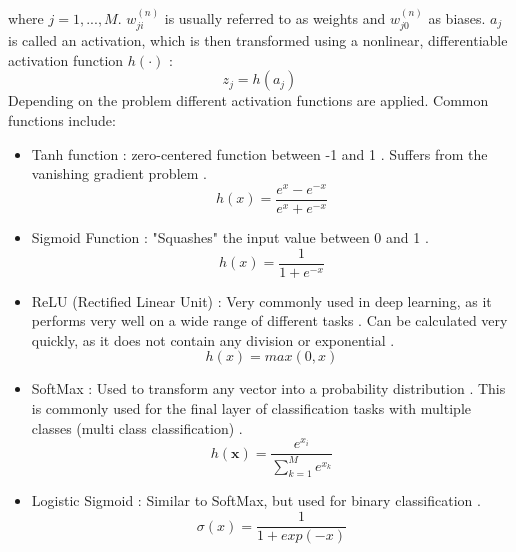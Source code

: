 \documentclass[draft,final,oneside]{vutinfth} %
\begin{document}
where $j = 1, ..., M$. $w_{ji}^{(n)}$ is usually referred to as weights and $w_{j0}^{(n)}$ as biases. $a_j$ is called an activation, which is then transformed using a nonlinear, differentiable activation function $h(\cdot)$ \cite{bishop}:
\begin{equation}
z_j = h(a_j)
\end{equation}
Depending on the problem different activation functions are applied. Common functions include:
\begin{itemize}
\item Tanh function \cite{activationfunctions}: zero-centered function between -1 and 1 \cite{activationfunctions}. Suffers from the vanishing gradient problem \cite{activationfunctions}.
\begin{equation}
h(x) = \dfrac{e^x - e^{-x}}{e^x + e^{-x}}
\end{equation}
\item Sigmoid Function \cite{anintroductiontoneuralnetworks}: "Squashes" the input value between 0 and 1 \cite{anintroductiontoneuralnetworks}.
\begin{equation}
h(x) = \dfrac {1} {1 + e^{-x}}
\end{equation}
\item ReLU (Rectified Linear Unit) \cite{Goodfellow-et-al-2016}: Very commonly used in deep learning, as it performs very well on a wide range of different tasks \cite{activationfunctions}. Can be calculated very quickly, as it does not contain any division or exponential \cite{activationfunctions}.
\begin{equation}
h(x) = max(0, x)
\end{equation}
\item SoftMax \cite{Goodfellow-et-al-2016}: Used to transform any vector into a probability distribution \cite{activationfunctions}. This is commonly used for the final layer of classification tasks with multiple classes (multi class classification) \cite{activationfunctions}.
\begin{equation}
h(\boldsymbol{x}) = \dfrac{e^{x_i}}{\sum_{k=1}^{M} e^{x_k}}
\end{equation}
\item Logistic Sigmoid \cite{Goodfellow-et-al-2016}: Similar to SoftMax, but used for binary classification \cite{Goodfellow-et-al-2016}.
\begin{equation}
\sigma(x) = \dfrac{1}{1 + exp(-x)}
\end{equation}
\end{itemize}
\end{document}

